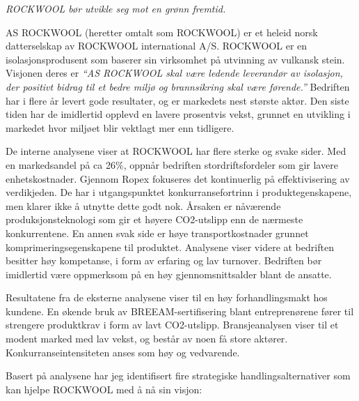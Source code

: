\textit{ROCKWOOL bør utvikle seg mot en grønn fremtid.}

\indent \newline
AS ROCKWOOL (heretter omtalt som ROCKWOOL) er et heleid norsk datterselskap av ROCKWOOL international A/S. ROCKWOOL er en isolasjonsprodusent som baserer sin virksomhet på utvinning av vulkansk stein. Visjonen deres er \textit{\textquotedblleft AS ROCKWOOL skal være ledende leverandør av isolasjon, der positivt bidrag til et bedre miljø og brannsikring skal være førende.\textquotedblright} Bedriften har i flere år levert gode resultater, og er markedets nest største aktør. Den siste tiden har de imidlertid opplevd en lavere prosentvis vekst, grunnet en utvikling i markedet hvor miljøet blir vektlagt mer enn tidligere.

\indent \newline
De interne analysene viser at ROCKWOOL har flere sterke og svake sider. Med en markedsandel på ca 26\%, oppnår bedriften stordriftsfordeler som gir lavere enhetskostnader. Gjennom Ropex fokuseres det kontinuerlig på effektivisering av verdikjeden. De har i utgangspunktet konkurransefortrinn i produktegenskapene, men klarer ikke å utnytte dette godt nok. Årsaken er nåværende produksjonsteknologi som gir et høyere CO2-utslipp enn de nærmeste konkurrentene. En annen svak side er høye transportkostnader grunnet komprimeringsegenskapene til produktet. Analysene viser videre at bedriften besitter høy kompetanse, i form av erfaring og lav turnover. Bedriften bør imidlertid være oppmerksom på en høy gjennomsnittsalder blant de ansatte. 

\indent \newline
Resultatene fra de eksterne analysene viser til en høy forhandlingsmakt hos kundene. En økende bruk av BREEAM-sertifisering blant entreprenørene fører til strengere produktkrav i form av lavt CO2-utslipp. Bransjeanalysen viser til et modent marked med lav vekst, og består av noen få store aktører. Konkurranseintensiteten anses som høy og vedvarende. 

\indent \newline
Basert på analysene har jeg identifisert fire strategiske handlingsalternativer som kan hjelpe ROCKWOOL med å nå sin visjon:

